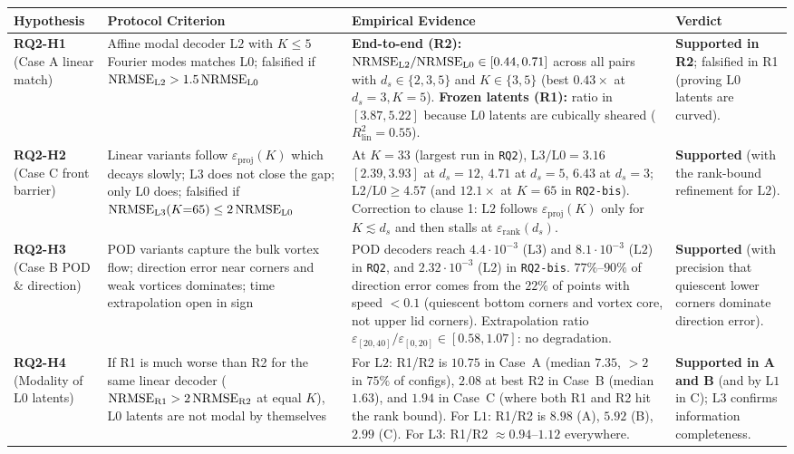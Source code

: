 \begin{table}[!htbp]
{\begin{tabular}{@{}p{2.2cm}p{4.3cm}p{5.5cm}p{3.2cm}@{}}
\toprule
\textbf{Hypothesis} & \textbf{Protocol Criterion} & \textbf{Empirical Evidence} & \textbf{Verdict} \\
\midrule
\textbf{RQ2-H1} \newline (Case A linear match) & Affine modal decoder $\mathrm{L2}$ with $K \le 5$ Fourier modes matches $\mathrm{L0}$; falsified if $\mathrm{NRMSE}_{\mathrm{L2}} > 1.5\,\mathrm{NRMSE}_{\mathrm{L0}}$ & \textbf{End-to-end (R2):} $\mathrm{NRMSE}_{\mathrm{L2}}/\mathrm{NRMSE}_{\mathrm{L0}} \in [0.44, 0.71]$ across all pairs with $d_s \in \{2,3,5\}$ and $K \in \{3,5\}$ (best $0.43\times$ at $d_s=3, K=5$). \textbf{Frozen latents (R1):} ratio in $[3.87, 5.22]$ because $\mathrm{L0}$ latents are cubically sheared ($R^2_{\mathrm{lin}} = 0.55$). & \textbf{Supported in R2}; falsified in R1 (proving $\mathrm{L0}$ latents are curved). \\
\midrule
\textbf{RQ2-H2} \newline (Case C front barrier) & Linear variants follow $\varepsilon_{\mathrm{proj}}(K)$ which decays slowly; $\mathrm{L3}$ does not close the gap; only $\mathrm{L0}$ does; falsified if $\mathrm{NRMSE}_{\mathrm{L3}}(K{=}65) \le 2\,\mathrm{NRMSE}_{\mathrm{L0}}$ & At $K=33$ (largest run in \texttt{RQ2}), $\mathrm{L3}/\mathrm{L0} = 3.16$ $[2.39, 3.93]$ at $d_s=12$, $4.71$ at $d_s=5$, $6.43$ at $d_s=3$; $\mathrm{L2}/\mathrm{L0} \ge 4.57$ (and $12.1\times$ at $K=65$ in \texttt{RQ2-bis}). Correction to clause 1: $\mathrm{L2}$ follows $\varepsilon_{\mathrm{proj}}(K)$ only for $K \lesssim d_s$ and then stalls at $\varepsilon_{\mathrm{rank}}(d_s)$. & \textbf{Supported} (with the rank-bound refinement for $\mathrm{L2}$). \\
\midrule
\textbf{RQ2-H3} \newline (Case B POD \& direction) & POD variants capture the bulk vortex flow; direction error near corners and weak vortices dominates; time extrapolation open in sign & POD decoders reach $4.4\cdot 10^{-3}$ ($\mathrm{L3}$) and $8.1\cdot 10^{-3}$ ($\mathrm{L2}$) in \texttt{RQ2}, and $2.32\cdot 10^{-3}$ ($\mathrm{L2}$) in \texttt{RQ2-bis}. $77\%$--$90\%$ of direction error comes from the $22\%$ of points with speed $< 0.1$ (quiescent bottom corners and vortex core, not upper lid corners). Extrapolation ratio $\varepsilon_{[20,40]}/\varepsilon_{[0,20]} \in [0.58, 1.07]$: no degradation. & \textbf{Supported} (with precision that quiescent lower corners dominate direction error). \\
\midrule
\textbf{RQ2-H4} \newline (Modality of $\mathrm{L0}$ latents) & If R1 is much worse than R2 for the same linear decoder ($\mathrm{NRMSE}_{\mathrm{R1}} > 2\,\mathrm{NRMSE}_{\mathrm{R2}}$ at equal $K$), $\mathrm{L0}$ latents are not modal by themselves & For $\mathrm{L2}$: R1/R2 is $10.75$ in Case~A (median $7.35$, $> 2$ in $75\%$ of configs), $2.08$ at best R2 in Case~B (median $1.63$), and $1.94$ in Case~C (where both R1 and R2 hit the rank bound). For $\mathrm{L1}$: R1/R2 is $8.98$ (A), $5.92$ (B), $2.99$ (C). For $\mathrm{L3}$: R1/R2 $\approx 0.94$--$1.12$ everywhere. & \textbf{Supported in A and B} (and by $\mathrm{L1}$ in C); $\mathrm{L3}$ confirms information completeness. \\

\end{tabular}}
\end{table}
